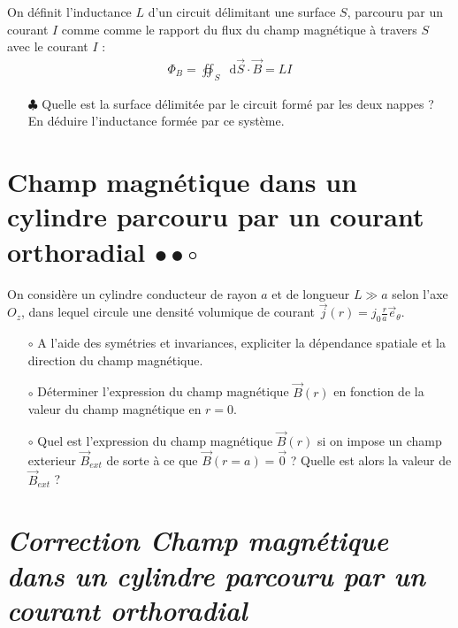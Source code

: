 \documentclass{report}
\newcommand*\dif{\mathop{}\!\mathrm{d}}
\begin{document}
On définit l'inductance $L$ d'un circuit délimitant une surface $S$, parcouru par un courant $I$ comme  comme le rapport du flux du champ magnétique à travers $S$ avec le courant $I$ :
	\begin{align*}
		\Phi_B=\oiint_S \dif \vec{S}\cdot\vec{B}=LI
	\end{align*}

\begin{itemize}

	\item[$\clubsuit$] Quelle est la surface délimitée par le circuit formé par les deux nappes ? En déduire l'inductance formée par ce système. 
	
\end{itemize}

\newpage

\section*{Champ magnétique dans un cylindre parcouru par un courant orthoradial $\bullet\bullet\circ$}

On considère un cylindre conducteur de rayon $a$ et de longueur $L\gg a$ selon l'axe $O_z$, dans lequel circule une densité volumique de courant $\vec{j}(r)=j_0\frac{r}{a}\vec{e}_\theta$.

\begin{itemize}

	\item[$\circ$] A l'aide des symétries et invariances, expliciter la dépendance spatiale et la direction du champ magnétique.
	\item[$\circ$] Déterminer l'expression du champ magnétique $\vec{B}(r)$ en fonction de la valeur du champ magnétique en $r=0$.
	\item[$\circ$] Quel est l'expression du champ magnétique $\vec{B}(r)$ si on impose un champ exterieur $\vec{B}_{ext}$ de sorte à ce que  $\vec{B}(r=a)=\vec{0}$ ? Quelle est alors la valeur de $\vec{B}_{ext}$ ?

\end{itemize}

\newpage

\section*{\textit{Correction Champ magnétique dans un cylindre parcouru par un courant orthoradial}}
\end{document}
